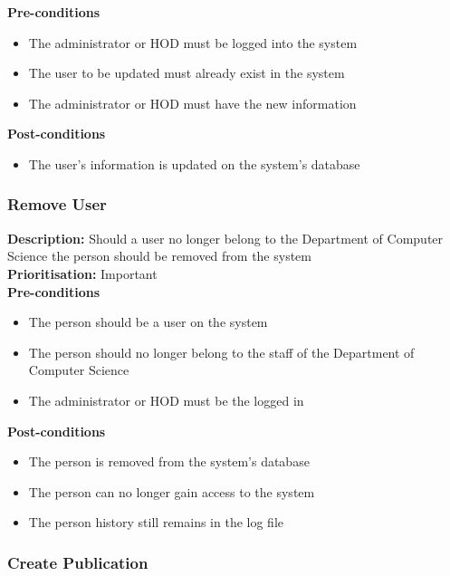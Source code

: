 \documentclass[a4paper]{article}
\begin{document}
    \textbf{Pre-conditions}
     \begin{itemize}
        \item The administrator or HOD must be logged into the system
        \item The user to be updated must already exist in the system
        \item The administrator or HOD must have the new information
   \end{itemize}
    
    \textbf{Post-conditions}
    \begin{itemize}
        \item The user's information is updated on the system's database
    \end{itemize}
    
    \subsubsection{Remove User}
    
    \textbf{Description:} Should a user no longer belong to the Department of Computer Science the person should be removed from the system\\
    \textbf{Prioritisation:} Important\\
    
    \textbf{Pre-conditions}
     \begin{itemize}
        \item The person should be a user on the system
        \item The person should no longer belong to the staff of the Department of Computer Science
        \item The administrator or HOD must be the logged in
   \end{itemize}
    
    \textbf{Post-conditions}
    \begin{itemize}
        \item The person is removed from the system's database
        \item The person can no longer gain access to the system
        \item The person history still remains in the log file
    \end{itemize}

    \subsubsection{Create Publication}
    
\end{document}
